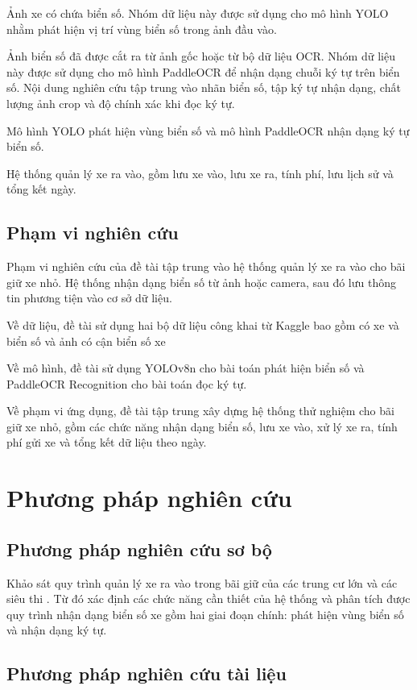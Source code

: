 \documentclass[13pt,a4paper]{report}
\begin{document}
Ảnh xe có chứa biển số. Nhóm dữ liệu này được sử dụng cho mô hình YOLO nhằm phát hiện vị trí vùng biển số trong ảnh đầu vào.

Ảnh biển số đã được cắt ra từ ảnh gốc hoặc từ bộ dữ liệu OCR. Nhóm dữ liệu này được sử dụng cho mô hình PaddleOCR để nhận dạng chuỗi ký tự trên biển số. Nội dung nghiên cứu tập trung vào nhãn biển số, tập ký tự nhận dạng, chất lượng ảnh crop và độ chính xác khi đọc ký tự.

Mô hình YOLO phát hiện vùng biển số và mô hình PaddleOCR nhận dạng ký tự biển số.

Hệ thống quản lý xe ra vào, gồm lưu xe vào, lưu xe ra, tính phí, lưu lịch sử và tổng kết ngày.
\subsection{Phạm vi nghiên cứu}

Phạm vi nghiên cứu của đề tài tập trung vào hệ thống quản lý xe ra vào cho bãi giữ xe nhỏ. Hệ thống nhận dạng biển số từ ảnh hoặc camera, sau đó lưu thông tin phương tiện vào cơ sở dữ liệu.

Về dữ liệu, đề tài sử dụng hai bộ dữ liệu công khai từ Kaggle bao gồm có xe và biển số và ảnh có cận biển số xe 

Về mô hình, đề tài sử dụng YOLOv8n cho bài toán phát hiện biển số và PaddleOCR Recognition cho bài toán đọc ký tự.

Về phạm vi ứng dụng, đề tài tập trung xây dựng hệ thống thử nghiệm cho bãi giữ xe nhỏ, gồm các chức năng nhận dạng biển số, lưu xe vào, xử lý xe ra, tính phí gửi xe và tổng kết dữ liệu theo ngày.
\section{Phương pháp nghiên cứu}

\subsection{Phương pháp nghiên cứu sơ bộ}

Khảo sát quy trình quản lý xe ra vào trong bãi giữ của các trung cư lớn và các siêu thi . Từ đó xác định các chức năng cần thiết của hệ thống và phân tích được quy trình nhận dạng biển số xe gồm hai giai đoạn chính: phát hiện vùng biển số và nhận dạng ký tự.
\subsection{Phương pháp nghiên cứu tài liệu}
\end{document}

